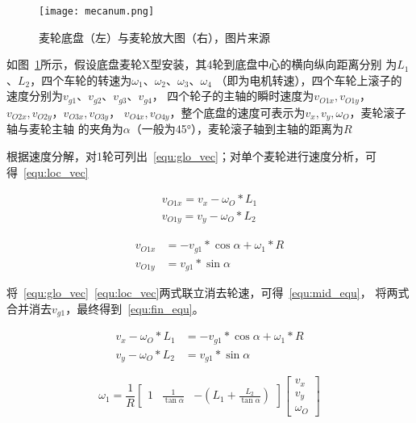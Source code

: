 \begin{figure}[ht] %
  \centering
  \texttt{[image: mecanum.png]}
  \caption{麦轮底盘（左）与麦轮放大图（右），图片来源\cite{mecanum}}
  \label{fig:mecanum}
\end{figure}

如图~\ref{fig:mecanum}所示，假设底盘麦轮X型安装，其4轮到底盘中心的横向纵向距离分别
为$L_1$、$L_2$，四个车轮的转速为$\omega_1$、$\omega_2$、$\omega_3$、$\omega_4$
（即为电机转速），四个车轮上滚子的速度分别为$v_{g1}$、$v_{g2}$、$v_{g3}$、$v_{g4}$，
四个轮子的主轴的瞬时速度为$v_{O1x}, v_{O1y}$，$v_{O2x}, v_{O2y}$，$v_{O3x}, v_{O3y}$，
$v_{O4x}, v_{O4y}$，整个底盘的速度可表示为$v_x, v_y, \omega_O$，麦轮滚子轴与麦轮主轴
的夹角为$\alpha$（一般为\ang{45}），麦轮滚子轴到主轴的距离为$R$

根据速度分解，对1轮可列出~\ref{equ:glo_vec}；对单个麦轮进行速度分析，可得~\ref{equ:loc_vec}

\begin{equation}
  \label{equ:glo_vec}
  \begin{aligned}
    v_{O1x} = v_x - \omega_O * L_1\\
    v_{O1y} = v_y - \omega_O * L_2
  \end{aligned}
\end{equation}

\begin{equation}
  \label{equ:loc_vec}
  \begin{aligned}
    v_{O1x} &= - v_{g1} * \cos\alpha + \omega_1 * R\\
    v_{O1y} &= v_{g1} * \sin\alpha
  \end{aligned}
\end{equation}

将~\ref{equ:glo_vec}~\ref{equ:loc_vec}两式联立消去轮速，可得~\ref{equ:mid_equ}，
将两式合并消去$v_{g1}$，最终得到~\ref{equ:fin_equ}。

\begin{equation}
  \label{equ:mid_equ}
  \begin{aligned}
    v_x - \omega_O * L_1 &= - v_{g1} * \cos\alpha + \omega_1 * R \\
    v_y - \omega_O * L_2 &= v_{g1} * \sin\alpha
  \end{aligned}
\end{equation}


\begin{equation}
  \label{equ:fin_equ}
  \omega_1 = \frac{1}{R}
    \begin{bmatrix}
      1 & \frac{1}{\tan\alpha} & -(L_1 + \frac{L_2}{\tan\alpha})
    \end{bmatrix}
    \begin{bmatrix}
      v_x \\
      v_y \\
      \omega_O
    \end{bmatrix}
\end{equation}

